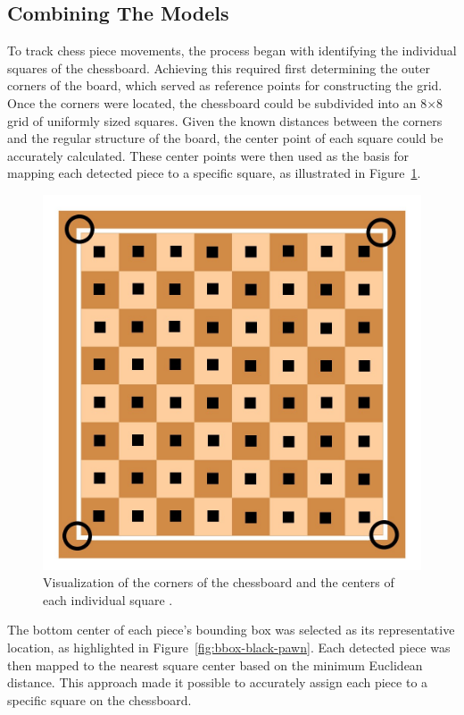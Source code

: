 \subsection{Combining The Models}

To track chess piece movements, the process began with identifying the individual squares of the chessboard. Achieving this required first determining the outer corners of the board, which served as reference points for constructing the grid. Once the corners were located, the chessboard could be subdivided into an 8×8 grid of uniformly sized squares. Given the known distances between the corners and the regular structure of the board, the center point of each square could be accurately calculated. These center points were then used as the basis for mapping each detected piece to a specific square, as illustrated in Figure~\ref{fig:chessboard-centers}.

\newpage



\begin{figure}[h!]
    \centering
    \includegraphics[width=0.75\linewidth]{figures/methods/ml-models/outer_corners_centers_chessboard.jpg}
    \caption[Chessboard corners and centers]{Visualization of the corners of the chessboard and the centers of each individual square \cite{vectorstock:chessboard-svg}.}
    \label{fig:chessboard-centers}
\end{figure}


The bottom center of each piece’s bounding box was selected as its representative location, as highlighted in Figure~\ref{fig:bbox-black-pawn}. Each detected piece was then mapped to the nearest square center based on the minimum Euclidean distance.  This approach made it possible to accurately assign each piece to a specific square on the chessboard.


